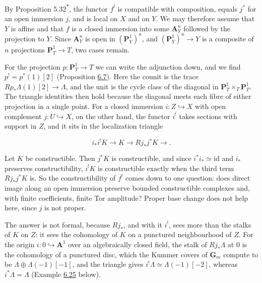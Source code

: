 \documentclass[11pt]{article}
\newcommand{\bpout}[1]{#1\textsuperscript{\hyperlink{bp-outside}{\ensuremath{\ast}}}}
\begin{document}
By Proposition \bpout{5.32}, the functor \(f^!\) is compatible with composition, equals \(j^*\) for an open immersion \(j\), and is local on \(X\) and on \(Y\). We may therefore assume that \(Y\) is affine and that \(f\) is a closed immersion into some \(\mathbf A^n_Y\) followed by the projection to \(Y\). Since \(\mathbf A^n_Y\) is open in \((\mathbf P^1_Y)^n\), and \((\mathbf P^1_Y)^n\to Y\) is a composite of \(n\) projections \(\mathbf P^1_T\to T\), two cases remain.

For the projection \(p:\mathbf P^1_T\to T\) we can write the adjunction down, and we find \(p^!=p^*(1)[2]\) (Proposition \hyperref[bp22]{6.7}). Here the counit is the trace \(Rp_*\Lambda(1)[2]\to\Lambda\), and the unit is the cycle class of the diagonal in \(\mathbf P^1_T\times_T\mathbf P^1_T\). The triangle identities then hold because the diagonal meets each fibre of either projection in a single point. For a closed immersion \(i:Z\hookrightarrow X\) with open complement \(j:U\hookrightarrow X\), on the other hand, the functor \(i^!\) takes sections with support in \(Z\), and it sits in the localization triangle

\[
i_*i^!K\longrightarrow K\longrightarrow Rj_*j^*K\longrightarrow .
\]

Let \(K\) be constructible. Then \(j^*K\) is constructible, and since \(i^*i_*\simeq\mathrm{id}\) and \(i_*\) preserves constructibility, \(i^!K\) is constructible exactly when the third term \(Rj_*j^*K\) is. So the constructibility of \(f^!\) comes down to one question: does direct image along an open immersion preserve bounded constructible complexes and, with finite coefficients, finite Tor amplitude? Proper base change does not help here, since \(j\) is not proper.

The answer is not formal, because \(Rj_*\), and with it \(i^!\), sees more than the stalks of \(K\) on \(Z\): it sees the cohomology of \(K\) on a punctured neighbourhood of \(Z\). For the origin \(i:0\hookrightarrow\mathbf A^1\) over an algebraically closed field, the stalk of \(Rj_*\Lambda\) at \(0\) is the cohomology of a punctured disc, which the Kummer covers of \(\mathbf G_m\) compute to be \(\Lambda\oplus\Lambda(-1)[-1]\), and the triangle gives \(i^!\Lambda\simeq\Lambda(-1)[-2]\), whereas \(i^*\Lambda=\Lambda\) (Example \hyperref[bp79]{6.25} below).
\end{document}
